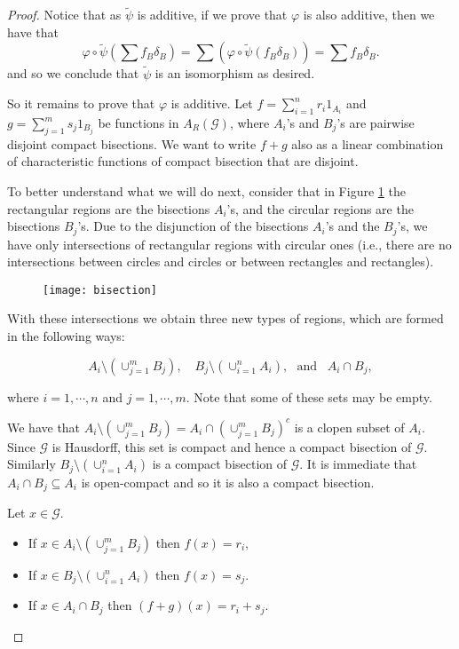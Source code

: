 \documentclass[11pt, a4paper]{amsart}
\newcommand{\G}{\ensuremath {\mathcal{G}}}
\theoremstyle{plain}
\begin{document}
\begin{proof}
Notice that as $\tilde{\psi}$ is additive, if we prove that $\varphi$ is also additive, then we have that
 $$\varphi\circ\tilde{\psi}(\sum f_B \delta_B) = \sum( \varphi\circ\tilde{\psi} (f_B \delta_B))=\sum f_B \delta_B.$$
and so we conclude that $\tilde{\psi}$ is an isomorphism as desired. 

So it remains to prove that $\varphi$ is additive. Let $f=\sum_{i=1}^n r_i 1_{A_i}$ and $g=\sum_{j=1}^m s_j 1_{B_j}$ be functions in $A_R(\G)$, where $A_i$'s and $B_j$'s are pairwise disjoint compact bisections. We want to write $f+g$ also as a linear combination of characteristic functions of compact bisection that are disjoint.

To better understand what we will do next, consider that in Figure \ref{Rotulo} the rectangular regions are the bisections $A_i$'s, and the circular regions are the bisections $B_j$'s. Due to the disjunction of the bisections $A_i$'s and the $B_j$'s, we have only intersections of rectangular regions with circular ones (i.e., there are no intersections between circles and circles or between rectangles and rectangles).

\begin{figure}[H]
\centering
\texttt{[image: bisection]}
\caption{}
\label{Rotulo}
\end{figure}

With these intersections we obtain three new types of regions, which are formed in the following ways:

$$ A_i\setminus(\cup_{j=1}^{m}B_j), \,\,\,\,\,\, B_j\setminus(\cup_{i=1}^{n}A_i),\,\,\,\, \mbox{and} \,\,\,\,\,  A_i \cap B_j, $$

where $i=1, \cdots, n$ and $j=1,\cdots, m.$ Note that some of these sets may be empty.

We have that $A_i \setminus (\cup_{j=1}^{m}B_j) = A_i \cap (\cup_{j=1}^{m}B_j)^c$ is a clopen subset of $A_i.$ Since $\G$ is Hausdorff, this set is compact and hence a compact bisection of $\G.$  Similarly  $B_j \setminus (\cup_{i=1}^{n}A_i)$ is a compact bisection of $\G.$ It is immediate that $A_i\cap B_j \subseteq A_i$ is open-compact and so it is also a compact bisection.

Let $x \in \G.$   
\begin{itemize}
\item If $x \in A_i \setminus (\cup_{j=1}^{m}B_j)$ then $f(x)=r_i, $ \vspace{0.1cm}
\item If $x \in B_j \setminus (\cup_{i=1}^{n}A_i)$ then $f(x)=s_j.$ \vspace{0.1cm}
\item If $x \in A_i \cap B_j$ then $(f+g)(x)= r_i+s_j.$
\end{itemize}


\end{proof}
\end{document}
